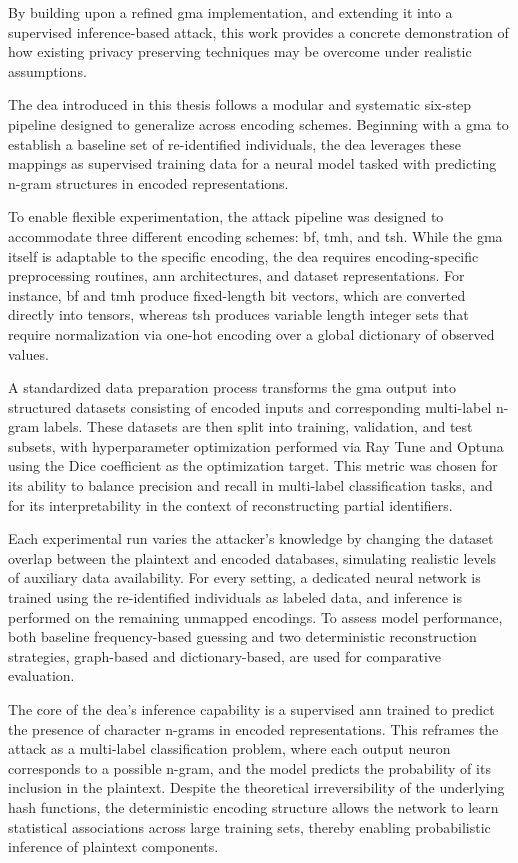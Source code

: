 By building upon a refined \ac{gma} implementation, and extending it into a supervised inference-based attack, this work provides a concrete demonstration of how existing privacy preserving techniques may be overcome under realistic assumptions.


The \ac{dea} introduced in this thesis follows a modular and systematic six-step pipeline designed to generalize across encoding schemes.
Beginning with a \ac{gma} to establish a baseline set of re-identified individuals, the \ac{dea} leverages these mappings as supervised training data for a neural model tasked with predicting n-gram structures in encoded representations.

To enable flexible experimentation, the attack pipeline was designed to accommodate three different encoding schemes: \ac{bf}, \ac{tmh}, and \ac{tsh}.
While the \ac{gma} itself is adaptable to the specific encoding, the \ac{dea} requires encoding-specific preprocessing routines, \ac{ann} architectures, and dataset representations.
For instance, \ac{bf} and \ac{tmh} produce fixed-length bit vectors, which are converted directly into tensors, whereas \ac{tsh} produces variable length integer sets that require normalization via one-hot encoding over a global dictionary of observed values.

A standardized data preparation process transforms the \ac{gma} output into structured datasets consisting of encoded inputs and corresponding multi-label n-gram labels.
These datasets are then split into training, validation, and test subsets, with hyperparameter optimization performed via Ray Tune and Optuna using the Dice coefficient as the optimization target.
This metric was chosen for its ability to balance precision and recall in multi-label classification tasks, and for its interpretability in the context of reconstructing partial identifiers.

Each experimental run varies the attacker’s knowledge by changing the dataset overlap between the plaintext and encoded databases, simulating realistic levels of auxiliary data availability.
For every setting, a dedicated neural network is trained using the re-identified individuals as labeled data, and inference is performed on the remaining unmapped encodings.
To assess model performance, both baseline frequency-based guessing and two deterministic reconstruction strategies, graph-based and dictionary-based, are used for comparative evaluation.

The core of the \ac{dea}’s inference capability is a supervised \ac{ann} trained to predict the presence of character n-grams in encoded representations.
This reframes the attack as a multi-label classification problem, where each output neuron corresponds to a possible n-gram, and the model predicts the probability of its inclusion in the plaintext.
Despite the theoretical irreversibility of the underlying hash functions, the deterministic encoding structure allows the network to learn statistical associations across large training sets, thereby enabling probabilistic inference of plaintext components.

